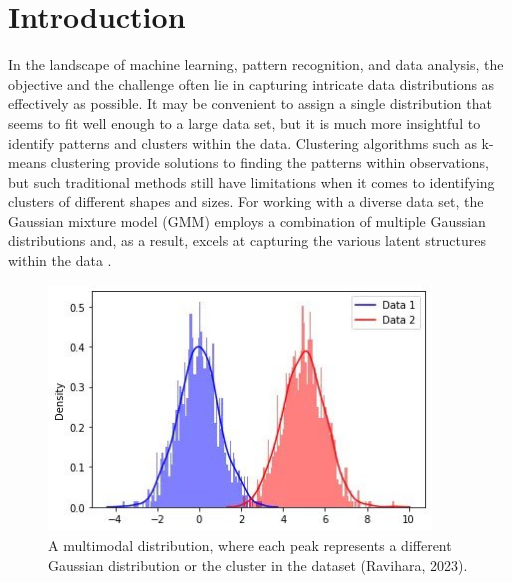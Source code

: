 \documentclass[12pt]{article}
\begin{document}
\vfill

\newpage
{} %

\hypertarget{introduction}{%
\section{Introduction}\label{introduction}}

In the landscape of machine learning, pattern recognition, and data
analysis, the objective and the challenge often lie in capturing
intricate data distributions as effectively as possible. It may be
convenient to assign a single distribution that seems to fit well enough
to a large data set, but it is much more insightful to identify patterns
and clusters within the data. Clustering algorithms such as k-means
clustering provide solutions to finding the patterns within
observations, but such traditional methods still have limitations when
it comes to identifying clusters of different shapes and sizes. For
working with a diverse data set, the Gaussian mixture model (GMM)
employs a combination of multiple Gaussian distributions and, as a
result, excels at capturing the various latent structures within the
data \citep{kumar2022gaussian}.

\begin{figure}[htbp] 
\centering 
\includegraphics[width=4in]{3.jpg} 
\caption{A multimodal distribution, where each peak represents a different Gaussian distribution or the cluster in the dataset (Ravihara, 2023).}
\end{figure}
\end{document}
